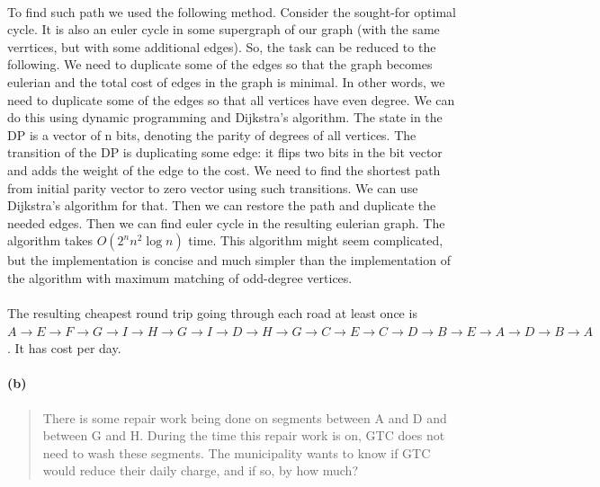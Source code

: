 \paragraph{}
To find such path we used the following method. Consider the sought-for optimal cycle. It is also an euler cycle in some supergraph of our graph (with the same verrtices, but with some additional edges). So, the task can be reduced to the following. We need to duplicate some of the edges so that the graph becomes eulerian and the total cost of edges in the graph is minimal. In other words, we need to duplicate some of the edges so that all vertices have even degree.  We can do this using dynamic programming and Dijkstra's algorithm. The state in the DP is a vector of n bits, denoting the parity of degrees of all vertices. The transition of the DP is duplicating some edge: it flips two bits in the bit vector and adds the weight of the edge to the cost. We need to find the shortest path from initial parity vector to zero vector using such transitions. We can use Dijkstra's algorithm for that. Then we can restore the path and duplicate the needed edges. Then we can find euler cycle in the resulting eulerian graph. The algorithm takes $O(2^n n^2 \log n)$ time. This algorithm might seem complicated, but the implementation is concise and much simpler than the implementation of the algorithm with maximum matching of odd-degree vertices.

\paragraph{}
The resulting cheapest round trip going through each road at least once is $ A \rightarrow E \rightarrow F \rightarrow G \rightarrow I \rightarrow H \rightarrow G \rightarrow I \rightarrow D \rightarrow H \rightarrow G \rightarrow C \rightarrow E \rightarrow C \rightarrow D \rightarrow B \rightarrow E \rightarrow A \rightarrow D \rightarrow B \rightarrow A $. It has cost  per day.

\paragraph{(b)}
\begin{quote}
There is some repair work being done on segments between A and D and between G and H. During the time this repair work is on, GTC does not need to wash these segments. The municipality wants to know if GTC would reduce their daily charge, and if so, by how much?
\end{quote}

